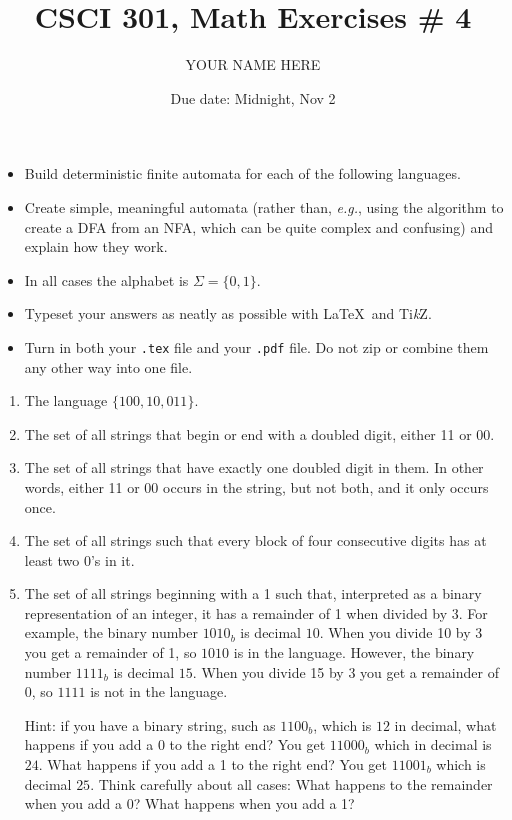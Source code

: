 \documentclass{article}
\title{CSCI 301, Math Exercises \# 4}
\author{YOUR NAME HERE}
\date{Due date:  Midnight, Nov 2}
\begin{document}
\maketitle

\begin{itemize}
  \item
Build deterministic finite automata
for each of the following languages.
\item
Create simple, meaningful automata
(rather than, {\em e.g.}, using the algorithm to create
a DFA from an NFA, which can be quite complex and confusing)
and explain how they work.
\item
In all
cases the alphabet is $\Sigma = \{0,1\}$.
\item
  Typeset your answers as neatly as possible with \LaTeX\ and
  Ti\textit{k}Z.
\item
  Turn in both your {\tt .tex} file and your {\tt .pdf} file.  Do not zip
  or combine them any other way into one file.
\end{itemize}

\begin{enumerate}

  \item   The language $\{100, 10, 011\}$. 

\item The set of 
  all strings that begin or end with a doubled digit, either 11 or 00.
  
\item
The set of all strings that have exactly one doubled digit in them.
  In other words, either 11 or 00 occurs in the string, but not both,
  and it only occurs once.

\item The set of all strings such that every block of four consecutive
  digits has at least two 0's in it.

\item The set of all strings beginning with a 1 such
  that, interpreted as a binary representation of an integer, it has a
  remainder of 1 when divided by 3.  For example, the binary number
  $1010_b$ is decimal $10$.  When you divide 10 by 3 you get a
  remainder of 1, so $1010$ is in the language.  However, the binary
  number $1111_b$ is decimal $15$.  When you divide 15 by 3 you get a
  remainder of 0, so $1111$ is not in the language.

  Hint: if you have a binary string, such as $1100_b$, which is
  $12$ in decimal, what happens if you add a 0 to the right end?
  You get $11000_b$ which in decimal is $24$.  What happens if
  you add a 1 to the right end?  You get $11001_b$ which is decimal
  $25$.  Think carefully about all cases:  What happens to the remainder
  when you add a 0?  What happens when you add a 1?

\end{enumerate}
\end{document}
